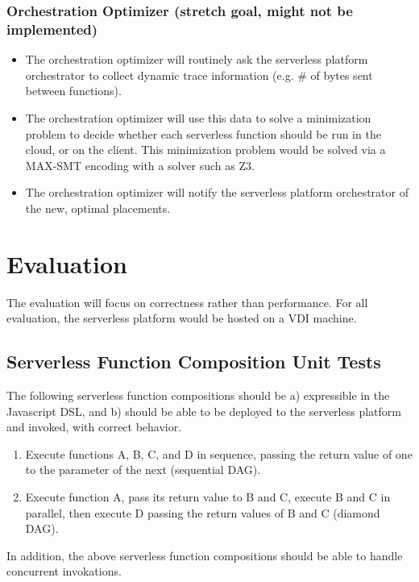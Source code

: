\documentclass[12pt]{article}
\begin{document}
\subsubsection{Orchestration Optimizer (stretch goal, might not be implemented)}
\begin{itemize}
  \item The orchestration optimizer will routinely ask the serverless
  platform orchestrator to collect dynamic trace information
  (e.g. \# of bytes sent between functions).
  \item The orchestration optimizer will use this data to solve a
  minimization problem to decide whether each serverless function
  should be run in the cloud, or on the client. This minimization
  problem would be solved via a MAX-SMT encoding with a solver
  such as Z3.
  \item The orchestration optimizer will notify the serverless
  platform orchestrator of the new, optimal placements.
\end{itemize}


\section{Evaluation}

The evaluation will focus on correctness rather than performance.
For all evaluation, the serverless platform would be
hosted on a VDI machine.

\subsection{Serverless Function Composition Unit Tests}

The following serverless function compositions should be
a) expressible in the Javascript DSL, and
b) should be able to be deployed to the serverless platform 
and invoked, with correct behavior.
\begin{enumerate}
  \item Execute functions A, B, C, and D in sequence, passing
  the return value of one to the parameter of the next (sequential DAG).
  \item Execute function A, pass its return value to B and C,
  execute B and C in parallel, then execute D passing
  the return values of B and C (diamond DAG).
\end{enumerate}

In addition, the above serverless function compositions should
be able to handle concurrent invokations.
\end{document}

